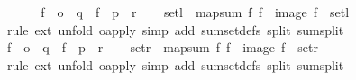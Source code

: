 \begin{isabellebody}
\ \ \isamarkupfalse%
\isanewline
{}\isamarkupfalse%
\isanewline
\ \ \isamarkupfalse%
\ f{}\ {\isacharcolon}{\kern0pt}{\isacharcolon}{\kern0pt}\ {\isachardoublequoteopen}{\isacharprime}{\kern0pt}o\ {\isasymRightarrow}\ {\isacharprime}{\kern0pt}q{\isachardoublequoteclose}\ \ f{}\ {\isacharcolon}{\kern0pt}{\isacharcolon}{\kern0pt}\ {\isachardoublequoteopen}{\isacharprime}{\kern0pt}p\ {\isasymRightarrow}\ {\isacharprime}{\kern0pt}r{\isachardoublequoteclose}\isanewline
\ \ \isamarkupfalse%
\ {\isachardoublequoteopen}setl\ {\isasymcirc}\ map{\isacharunderscore}{\kern0pt}sum\ f{}\ f{}\ {\isacharequal}{\kern0pt}\ image\ f{}\ {\isasymcirc}\ setl{\isachardoublequoteclose}\isanewline
\ \ \ \ \isamarkupfalse%
\ {\isacharparenleft}{\kern0pt}rule\ ext{\isacharcomma}{\kern0pt}\ unfold\ o{\isacharunderscore}{\kern0pt}apply{\isacharparenright}{\kern0pt}\ {\isacharparenleft}{\kern0pt}simp\ add{\isacharcolon}{\kern0pt}\ sum{\isacharunderscore}{\kern0pt}set{\isacharunderscore}{\kern0pt}defs{\isacharparenleft}{\kern0pt}{}{\isacharparenright}{\kern0pt}\ split{\isacharcolon}{\kern0pt}\ sum{\isachardot}{\kern0pt}split{\isacharparenright}{\kern0pt}\isanewline
{}\isamarkupfalse%
\isanewline
\ \ \isamarkupfalse%
\ f{}\ {\isacharcolon}{\kern0pt}{\isacharcolon}{\kern0pt}\ {\isachardoublequoteopen}{\isacharprime}{\kern0pt}o\ {\isasymRightarrow}\ {\isacharprime}{\kern0pt}q{\isachardoublequoteclose}\ \ f{}\ {\isacharcolon}{\kern0pt}{\isacharcolon}{\kern0pt}\ {\isachardoublequoteopen}{\isacharprime}{\kern0pt}p\ {\isasymRightarrow}\ {\isacharprime}{\kern0pt}r{\isachardoublequoteclose}\isanewline
\ \ \isamarkupfalse%
\ {\isachardoublequoteopen}setr\ {\isasymcirc}\ map{\isacharunderscore}{\kern0pt}sum\ f{}\ f{}\ {\isacharequal}{\kern0pt}\ image\ f{}\ {\isasymcirc}\ setr{\isachardoublequoteclose}\isanewline
\ \ \ \ \isamarkupfalse%
\ {\isacharparenleft}{\kern0pt}rule\ ext{\isacharcomma}{\kern0pt}\ unfold\ o{\isacharunderscore}{\kern0pt}apply{\isacharparenright}{\kern0pt}\ {\isacharparenleft}{\kern0pt}simp\ add{\isacharcolon}{\kern0pt}\ sum{\isacharunderscore}{\kern0pt}set{\isacharunderscore}{\kern0pt}defs{\isacharparenleft}{\kern0pt}{}{\isacharparenright}{\kern0pt}\ split{\isacharcolon}{\kern0pt}\ sum{\isachardot}{\kern0pt}split{\isacharparenright}{\kern0pt}\isanewline
{}\isamarkupfalse%

\end{isabellebody}
